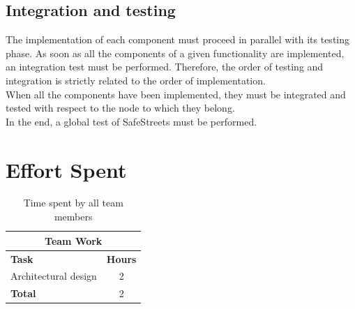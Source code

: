 \documentclass{article}
\begin{document}
		\subsection{Integration and testing}
			The implementation of each component must proceed in parallel with its testing phase. As soon as all the components of a given functionality are implemented, an integration test must be performed. Therefore, the order of testing and integration is strictly related to the order of implementation.\\
			When all the components have been implemented, they must be integrated and tested with respect to the node to which they belong.\\
			In the end, a global test of SafeStreets must be performed.\\
	
	\clearpage
	\section{Effort Spent}
		\begin{table}[h]
			\centering
			\begin{tabular}{l c}
				\hline\hline
				\multicolumn{2}{c}{\textbf{Team Work}} \\
				\hline
				\textbf{Task} & \textbf{Hours} \\ [0.5ex]
				\hline
				Architectural design & 2  \\
				
				\hline
				\textbf{Total} & 2  \\
				\hline
			\end{tabular}
			\caption{Time spent by all team members}
			\label{fig:Time spent by all team members}
		\end{table}
		
\end{document}
